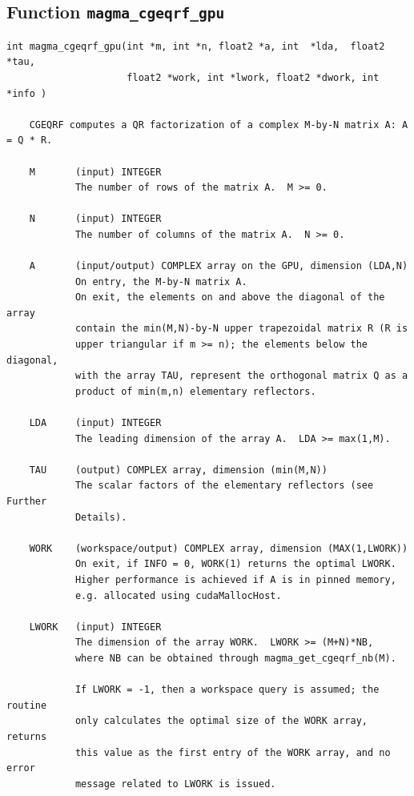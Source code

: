 \documentclass[10pt]{book}
\begin{document}

\newpage
\subsection{Function {\tt {\bf magma\_cgeqrf\_gpu}}}
\begin{verbatim}
int magma_cgeqrf_gpu(int *m, int *n, float2 *a, int  *lda,  float2  *tau,
                     float2 *work, int *lwork, float2 *dwork, int *info )
  
    CGEQRF computes a QR factorization of a complex M-by-N matrix A: A = Q * R.   

    M       (input) INTEGER   
            The number of rows of the matrix A.  M >= 0.   

    N       (input) INTEGER   
            The number of columns of the matrix A.  N >= 0.   

    A       (input/output) COMPLEX array on the GPU, dimension (LDA,N)   
            On entry, the M-by-N matrix A.   
            On exit, the elements on and above the diagonal of the array   
            contain the min(M,N)-by-N upper trapezoidal matrix R (R is   
            upper triangular if m >= n); the elements below the diagonal,   
            with the array TAU, represent the orthogonal matrix Q as a   
            product of min(m,n) elementary reflectors.

    LDA     (input) INTEGER   
            The leading dimension of the array A.  LDA >= max(1,M).   

    TAU     (output) COMPLEX array, dimension (min(M,N))   
            The scalar factors of the elementary reflectors (see Further   
            Details).   

    WORK    (workspace/output) COMPLEX array, dimension (MAX(1,LWORK))   
            On exit, if INFO = 0, WORK(1) returns the optimal LWORK.   
            Higher performance is achieved if A is in pinned memory, 
            e.g. allocated using cudaMallocHost.

    LWORK   (input) INTEGER   
            The dimension of the array WORK.  LWORK >= (M+N)*NB,   
            where NB can be obtained through magma_get_cgeqrf_nb(M).

            If LWORK = -1, then a workspace query is assumed; the routine   
            only calculates the optimal size of the WORK array, returns   
            this value as the first entry of the WORK array, and no error   
            message related to LWORK is issued.   


\end{verbatim}
\end{document}
